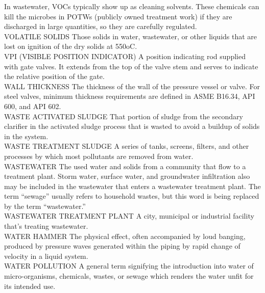 \documentclass{article}
\begin{document}
In wastewater, VOCs typically show up as cleaning solvents. These chemicals can kill the microbes in POTWs (publicly owned treatment work) if they are discharged in large quantities, so they are carefully regulated. 
\vspace{0.3cm}\\
VOLATILE SOLIDS
Those solids in water, wastewater, or other liquids that are lost on ignition of the dry solids at 550oC.
\vspace{0.3cm}\\
VPI (VISIBLE POSITION INDICATOR)
A position indicating rod supplied with gate valves. It extends from the top of the valve stem and serves to indicate the relative position of the gate.
\vspace{0.3cm}\\
WALL THICKNESS
The thickness of the wall of the pressure vessel or valve. For steel valves, minimum thickness requirements are defined in ASME B16.34, API 600, and API 602.
\vspace{0.3cm}\\
WASTE ACTIVATED SLUDGE
That portion of sludge from the secondary clarifier in the activated sludge process that is wasted to avoid a buildup of solids in the system.
\vspace{0.3cm}\\
WASTE TREATMENT SLUDGE
A series of tanks, screens, filters, and other processes by which most pollutants are removed from water.
\vspace{0.3cm}\\
WASTEWATER
The used water and solids from a community that flow to a treatment plant. Storm water, surface water, and groundwater infiltration also may be included in the wastewater that enters a wastewater treatment plant. The term “sewage” usually refers to household wastes, but this word is being replaced by the term “wastewater.”
\vspace{0.3cm}\\
WASTEWATER TREATMENT PLANT
A city, municipal or industrial facility that’s treating wastewater.
\vspace{0.3cm}\\
WATER HAMMER
The physical effect, often accompanied by loud banging, produced by pressure waves generated within the piping by rapid change of velocity in a liquid system.
\vspace{0.3cm}\\
WATER POLLUTION
A general term signifying the introduction into water of micro-organisms, chemicals, wastes, or sewage which renders the water unfit for its intended use.
\end{document}
